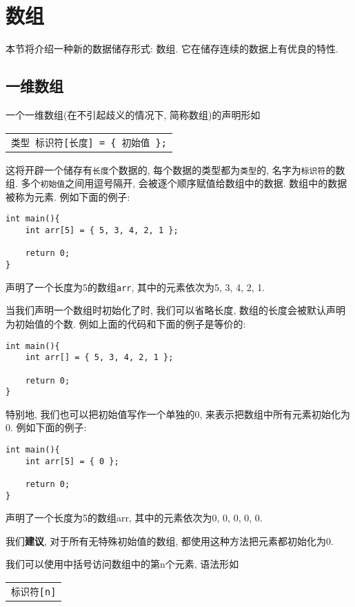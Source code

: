 \chapter{数组} \label{数组}
    本节将介绍一种新的数据储存形式: 数组. 它在储存连续的数据上有优良的特性.

    \section{一维数组}
        一个一维数组(在不引起歧义的情况下, 简称数组)的声明形如
        \begin{center}
        \begin{longtable}{l}
            \texttt{类型~标识符\hspace*{-0.25pt}[长度] = \{~初始值~\};}
        \end{longtable}
        \end{center}

        这将开辟一个储存有\texttt{长度}个数据的, 每个数据的类型都为\texttt{类型}的, 名字为\texttt{标识符}的数组. 多个\texttt{初始值}之间用逗号隔开, 会被逐个顺序赋值给数组中的数据. 数组中的数据被称为元素. 例如下面的例子:
\begin{lstlisting}
int main(){
    int arr[5] = { 5, 3, 4, 2, 1 };

    return 0;
}
\end{lstlisting}
        声明了一个长度为5的数组\texttt{arr}, 其中的元素依次为5, 3, 4, 2, 1.

        当我们声明一个数组时初始化了时, 我们可以省略长度, 数组的长度会被默认声明为初始值的个数. 例如上面的代码和下面的例子是等价的:
\begin{lstlisting}
int main(){
    int arr[] = { 5, 3, 4, 2, 1 };

    return 0;
}
\end{lstlisting}

        特别地, 我们也可以把初始值写作一个单独的0, 来表示把数组中所有元素初始化为0. 例如下面的例子:
\begin{lstlisting}
int main(){
    int arr[5] = { 0 };

    return 0;
}
\end{lstlisting}
        声明了一个长度为5的数组arr, 其中的元素依次为0, 0, 0, 0, 0.

        我们\textbf{建议}, 对于所有无特殊初始值的数组, 都使用这种方法把元素都初始化为0.

        我们可以使用中括号访问数组中的第n个元素, 语法形如
        \begin{center}
        \begin{longtable}{l}
            \texttt{标识符\hspace*{-0.25pt}[n]}
        \end{longtable}
        \end{center}

